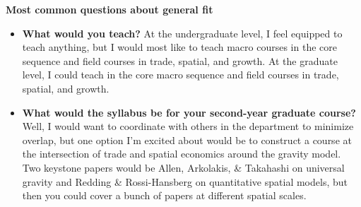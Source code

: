 \documentclass{jmstatement}
\begin{document}

\newpage
\textbf{Most common questions about general fit}
\vspace{-2ex}
\begin{itemize}
    \item \textbf{What would you teach?}
    At the undergraduate level, I feel equipped to teach anything, but I would
    most like to teach macro courses in the core sequence and field courses in
    trade, spatial, and growth. At the graduate level, I could teach in the core
    macro sequence and field courses in trade, spatial, and growth.
    \item \textbf{What would the syllabus be for your second-year graduate course?}
    Well, I would want to coordinate with others in the department to minimize
    overlap, but one option I'm excited about would be to construct a course at
    the intersection of trade and spatial economics around the gravity model.
    Two keystone papers would be Allen, Arkolakis, \& Takahashi on universal
    gravity and Redding \& Rossi-Hansberg on quantitative spatial models, but
    then you could cover a bunch of papers at different spatial scales.
\end{itemize}
\end{document}
